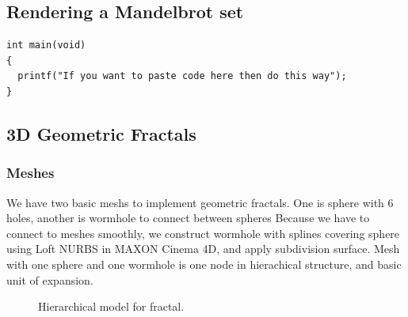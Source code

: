 \documentclass[a4paper]{article}
\begin{document}
\subsection{Rendering a Mandelbrot set}

\begin{lstlisting}[style=CStyle]
int main(void)
{
  printf("If you want to paste code here then do this way");
}
\end{lstlisting}
\subsection{3D Geometric Fractals}
\subsubsection{Meshes}
We have two basic meshs to implement geometric fractals.
One is sphere with 6 holes, another is wormhole to connect between spheres
Because we have to connect to meshes smoothly, we construct wormhole with splines covering sphere using Loft NURBS in MAXON Cinema 4D, and apply subdivision surface.
Mesh with one sphere and one wormhole is one node in hierachical structure, and basic unit of expansion.
\begin{figure}[H]
\centering
{}
\caption[1]{Hierarchical model for fractal.}
\end{figure}
\end{document}
